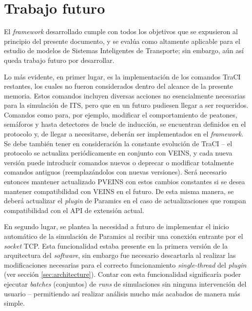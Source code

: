 \section{Trabajo futuro}

El \emph{framework} desarrollado cumple con todos los objetivos que se expusieron al principio del presente documento, y se evalúa como altamente aplicable para el estudio de modelos de Sistemas Inteligentes de Transporte; sin embargo, aún así queda trabajo futuro por desarrollar. 

Lo más evidente, en primer lugar, es la implementación de los comandos TraCI restantes, los cuales no fueron considerados dentro del alcance de la presente memoria. Estos comandos incluyen diversas acciones no esencialmente necesarias para la simulación de ITS, pero que en un futuro pudiesen llegar a ser requeridos. Comandos como para, por ejemplo, modificar el comportamiento de peatones, semáforos y hasta detectores de bucle de inducción, se encuentran definidos en el protocolo y, de llegar a necesitarse, deberán ser implementados en el \emph{framework}. 
Se debe también tener en consideración la constante evolución de TraCI -- el protocolo se actualiza periódicamente en conjunto con VEINS, y cada nueva versión puede introducir comandos nuevos o deprecar o modificar totalmente comandos antiguos (reemplazándolos con nuevas versiones). Será necesario entonces mantener actualizado PVEINS con estos cambios constantes si se desea mantener compatibilidad con VEINS en el futuro. 
De esta misma manera, se deberá actualizar el \emph{plugin} de Paramics en el caso de actualizaciones que rompan compatibilidad con el API de extensión actual.

En segundo lugar, se plantea la necesidad a futuro de implementar el inicio automático de la simulación de Paramics al recibir una conexión entrante por el \emph{socket} TCP. Esta funcionalidad estaba presente en la primera versión de la arquitectura del \emph{software}, sin embargo fue necesario descartarla al realizar las modificaciones necesarias para el correcto funcionamiento \emph{single-thread} del \emph{plugin} (ver sección \ref{sec:architecture}). Contar con esta funcionalidad significaría poder ejecutar \emph{batches} (conjuntos) de \emph{runs} de simulaciones sin ninguna intervención del usuario -- permitiendo así realizar análisis mucho más acabados de manera más simple.

